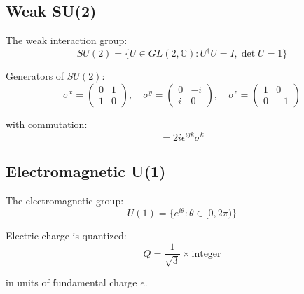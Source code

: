 \subsection{Weak SU(2)}

\begin{definition}
\label{def:su2}
The weak interaction group:
\begin{equation}
SU(2) = \{U \in GL(2,\mathbb{C}) : U^\dagger U = I, \det U = 1\}
\end{equation}
\end{definition}

\begin{theorem}
\label{thm:pauli}
Generators of $SU(2)$:
\begin{equation}
\sigma^x = \begin{pmatrix}0 & 1 \\ 1 & 0\end{pmatrix}, \quad
\sigma^y = \begin{pmatrix}0 & -i \\ i & 0\end{pmatrix}, \quad
\sigma^z = \begin{pmatrix}1 & 0 \\ 0 & -1\end{pmatrix}
\end{equation}

with commutation:
\begin{equation}
[\sigma^i, \sigma^j] = 2i\epsilon^{ijk} \sigma^k
\end{equation}
\end{theorem}

\subsection{Electromagnetic U(1)}

\begin{definition}
\label{def:u1}
The electromagnetic group:
\begin{equation}
U(1) = \{e^{i\theta} : \theta \in [0,2\pi)\}
\end{equation}
\end{definition}

\begin{proposition}
\label{prop:u1-charge}
Electric charge is quantized:
\begin{equation}
Q = \frac{1}{\sqrt{3}} \times \text{integer}
\end{equation}

in units of fundamental charge $e$.
\end{proposition}

